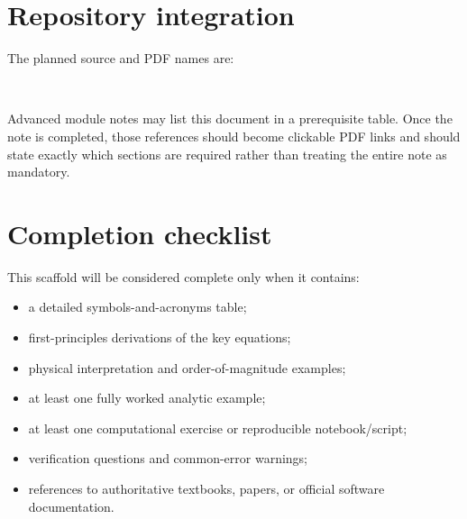 \documentclass[11pt]{article}
\begin{document}
\section{Repository integration}
The planned source and PDF names are:
\begin{center}
\\
\end{center}
Advanced module notes may list this document in a prerequisite table. Once the note is completed, those references should become clickable PDF links and should state exactly which sections are required rather than treating the entire note as mandatory.

\section{Completion checklist}
This scaffold will be considered complete only when it contains:
\begin{itemize}[leftmargin=1.6em]
\item a detailed symbols-and-acronyms table;
\item first-principles derivations of the key equations;
\item physical interpretation and order-of-magnitude examples;
\item at least one fully worked analytic example;
\item at least one computational exercise or reproducible notebook/script;
\item verification questions and common-error warnings;
\item references to authoritative textbooks, papers, or official software documentation.
\end{itemize}
\end{document}
